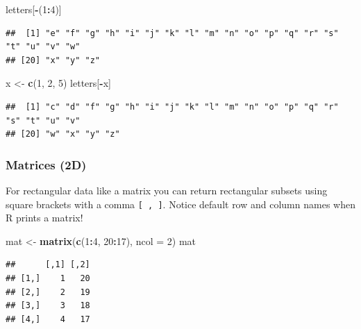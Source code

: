 \documentclass[
]{book}
\newenvironment{Shaded}{\begin{snugshade}}{\end{snugshade}}
\newcommand{\DataTypeTok}[1]{\textcolor[rgb]{0.13,0.29,0.53}{#1}}
\newcommand{\DecValTok}[1]{\textcolor[rgb]{0.00,0.00,0.81}{#1}}
\newcommand{\KeywordTok}[1]{\textcolor[rgb]{0.13,0.29,0.53}{\textbf{#1}}}
\newcommand{\NormalTok}[1]{#1}
\newcommand{\OperatorTok}[1]{\textcolor[rgb]{0.81,0.36,0.00}{\textbf{#1}}}
\newcommand{\StringTok}[1]{\textcolor[rgb]{0.31,0.60,0.02}{#1}}
\theoremstyle{definition}
\theoremstyle{definition}
\theoremstyle{definition}
\theoremstyle{remark}
\begin{document}
\begin{Shaded}
\begin{Highlighting}[]
\NormalTok{letters[}\OperatorTok{-}\NormalTok{(}\DecValTok{1}\OperatorTok{:}\DecValTok{4}\NormalTok{)]}
\end{Highlighting}
\end{Shaded}

\begin{verbatim}
##  [1] "e" "f" "g" "h" "i" "j" "k" "l" "m" "n" "o" "p" "q" "r" "s" "t" "u" "v" "w"
## [20] "x" "y" "z"
\end{verbatim}

\begin{Shaded}
\begin{Highlighting}[]
\NormalTok{x <-}\StringTok{ }\KeywordTok{c}\NormalTok{(}\DecValTok{1}\NormalTok{, }\DecValTok{2}\NormalTok{, }\DecValTok{5}\NormalTok{)}
\NormalTok{letters[}\OperatorTok{-}\NormalTok{x]}
\end{Highlighting}
\end{Shaded}

\begin{verbatim}
##  [1] "c" "d" "f" "g" "h" "i" "j" "k" "l" "m" "n" "o" "p" "q" "r" "s" "t" "u" "v"
## [20] "w" "x" "y" "z"
\end{verbatim}

\hypertarget{matrices-2d}{%
\subsubsection{Matrices (2D)}\label{matrices-2d}}

For rectangular data like a matrix you can return rectangular subsets using square brackets with a comma \texttt{{[}\ ,\ {]}}. Notice default row and column names when R prints a matrix!

\begin{Shaded}
\begin{Highlighting}[]
\NormalTok{mat <-}\StringTok{ }\KeywordTok{matrix}\NormalTok{(}\KeywordTok{c}\NormalTok{(}\DecValTok{1}\OperatorTok{:}\DecValTok{4}\NormalTok{, }\DecValTok{20}\OperatorTok{:}\DecValTok{17}\NormalTok{), }\DataTypeTok{ncol =} \DecValTok{2}\NormalTok{)}
\NormalTok{mat}
\end{Highlighting}
\end{Shaded}

\begin{verbatim}
##      [,1] [,2]
## [1,]    1   20
## [2,]    2   19
## [3,]    3   18
## [4,]    4   17
\end{verbatim}
\end{document}
